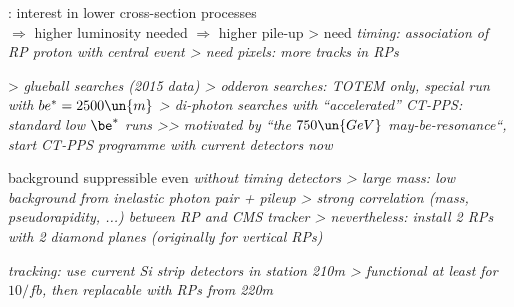 \> : interest in lower cross-section processes\\ $\Rightarrow$ higher luminosity needed $\Rightarrow$ higher pile-up
\>> need \em{timing}: association of RP proton with central event
\>> need \em{pixels}: more tracks in RPs

\cThird
\centerline{%
%
}



\> 
\>> \em{glueball} searches (2015 data)
\>> \em{odderon} searches: TOTEM only, special run with $be^* = 2500\un{m}$
\>> \em{di-photon} searches with ``accelerated'' CT-PPS: standard low $\be^*$ runs
\>>> motivated by ``the $750\un{GeV}$ may-be-resonance``, start CT-PPS programme with current detectors now


\newpage %


\> background suppressible even \em{without timing} detectors
\>> large mass: low background from inelastic photon pair + pileup
\>> strong correlation (mass, pseudorapidity, ...) between RP and CMS tracker
\>> nevertheless: install 2 RPs with 2 diamond planes (originally for vertical RPs)

\> \em{tracking: use current Si strip} detectors in station 210m
\>> functional at least for $10/fb$, then replacable with RPs from 220m


